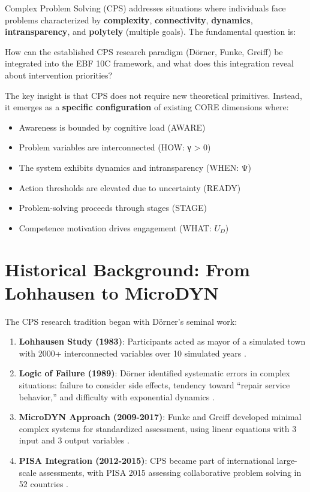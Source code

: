 Complex Problem Solving (CPS) addresses situations where individuals face problems characterized by \textbf{complexity}, \textbf{connectivity}, \textbf{dynamics}, \textbf{intransparency}, and \textbf{polytely} (multiple goals). The fundamental question is:

\begin{tcolorbox}[colback=yellow!10!white, colframe=orange!75!black,
    title=Central Question]
How can the established CPS research paradigm (Dörner, Funke, Greiff) be integrated into the EBF 10C framework, and what does this integration reveal about intervention priorities?
\end{tcolorbox}

The key insight is that CPS does not require new theoretical primitives. Instead, it emerges as a \textbf{specific configuration} of existing CORE dimensions where:
\begin{itemize}
\item Awareness is bounded by cognitive load (AWARE)
\item Problem variables are interconnected (HOW: γ > 0)
\item The system exhibits dynamics and intransparency (WHEN: Ψ)
\item Action thresholds are elevated due to uncertainty (READY)
\item Problem-solving proceeds through stages (STAGE)
\item Competence motivation drives engagement (WHAT: $U_D$)
\end{itemize}


\section{Historical Background: From Lohhausen to MicroDYN}
\label{sec:cps-history}

The CPS research tradition began with Dörner's seminal work:

\begin{enumerate}
\item \textbf{Lohhausen Study (1983)}: Participants acted as mayor of a simulated town with 2000+ interconnected variables over 10 simulated years \citep{PAP-doerner1983lohhausen}.

\item \textbf{Logic of Failure (1989)}: Dörner identified systematic errors in complex situations: failure to consider side effects, tendency toward ``repair service behavior,'' and difficulty with exponential dynamics \citep{PAP-doerner1989logik}.

\item \textbf{MicroDYN Approach (2009-2017)}: Funke and Greiff developed minimal complex systems for standardized assessment, using linear equations with 3 input and 3 output variables \citep{PAP-greiff2017microdynamapproach}.

\item \textbf{PISA Integration (2012-2015)}: CPS became part of international large-scale assessments, with PISA 2015 assessing collaborative problem solving in 52 countries \citep{PAP-oecd2017pisa2015cps}.
\end{enumerate}


